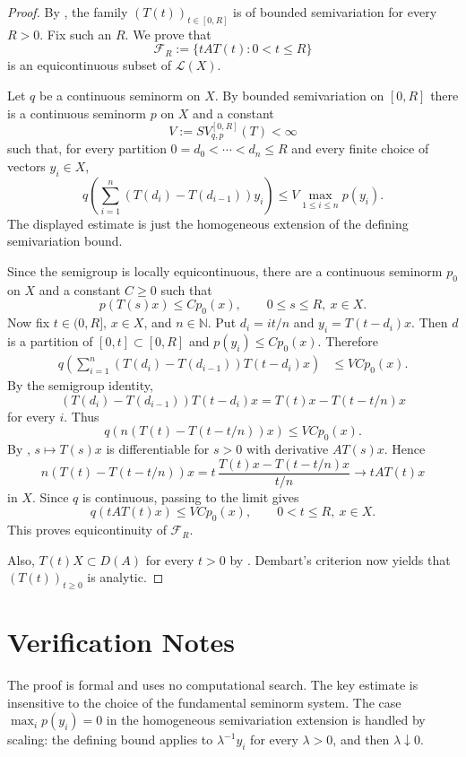 \documentclass[11pt]{article}
\newcommand{\N}{\mathbb{N}}
\newcommand{\cL}{\mathcal{L}}
\begin{document}
\begin{proof}
By \cite[Remark 4.1(a)]{KS2024}, the family $(T(t))_{t\in[0,R]}$ is of bounded
semivariation for every $R>0$.  Fix such an $R$.  We prove that
\[
  \mathcal{F}_R:=\{tAT(t):0<t\le R\}
\]
is an equicontinuous subset of $\cL(X)$.

Let $q$ be a continuous seminorm on $X$.  By bounded semivariation on $[0,R]$
there is a continuous seminorm $p$ on $X$ and a constant
\[
  V:=SV^{[0,R]}_{q,p}(T)<\infty
\]
such that, for every partition $0=d_0<\cdots<d_n\le R$ and every finite choice
of vectors $y_i\in X$,
\[
  q\left(\sum_{i=1}^n (T(d_i)-T(d_{i-1}))y_i\right)
  \le V \max_{1\le i\le n} p(y_i).
\]
The displayed estimate is just the homogeneous extension of the defining
semivariation bound.

Since the semigroup is locally equicontinuous, there are a continuous seminorm
$p_0$ on $X$ and a constant $C\ge0$ such that
\[
  p(T(s)x)\le C p_0(x),\qquad 0\le s\le R,\ x\in X.
\]
Now fix $t\in(0,R]$, $x\in X$, and $n\in\N$.  Put $d_i=it/n$ and
$y_i=T(t-d_i)x$.  Then $d$ is a partition of $[0,t]\subset[0,R]$ and
$p(y_i)\le Cp_0(x)$.  Therefore
\[
\begin{aligned}
q\left(\sum_{i=1}^n (T(d_i)-T(d_{i-1}))T(t-d_i)x\right)
&\le VCp_0(x).
\end{aligned}
\]
By the semigroup identity,
\[
  (T(d_i)-T(d_{i-1}))T(t-d_i)x
  =
  T(t)x-T(t-t/n)x
\]
for every $i$.  Thus
\[
  q\left(n(T(t)-T(t-t/n))x\right)\le VCp_0(x).
\]
By \cite[Corollary 4.16]{KS2024}, $s\mapsto T(s)x$ is differentiable for
$s>0$ with derivative $AT(s)x$.  Hence
\[
  n(T(t)-T(t-t/n))x
  =
  t\,\frac{T(t)x-T(t-t/n)x}{t/n}
  \longrightarrow tAT(t)x
\]
in $X$.  Since $q$ is continuous, passing to the limit gives
\[
  q(tAT(t)x)\le VCp_0(x),\qquad 0<t\le R,\ x\in X.
\]
This proves equicontinuity of $\mathcal{F}_R$.

Also, $T(t)X\subset D(A)$ for every $t>0$ by \cite[Corollary 4.6]{KS2024}.
Dembart's criterion \cite[Theorem 1, p.154]{Dembart1974} now yields that
$(T(t))_{t\geq0}$ is analytic.
\end{proof}

\section*{Verification Notes}

The proof is formal and uses no computational search.  The key estimate is
insensitive to the choice of the fundamental seminorm system.  The case
$\max_i p(y_i)=0$ in the homogeneous semivariation extension is handled by
scaling: the defining bound applies to $\lambda^{-1}y_i$ for every
$\lambda>0$, and then $\lambda\downarrow0$.
\end{document}
